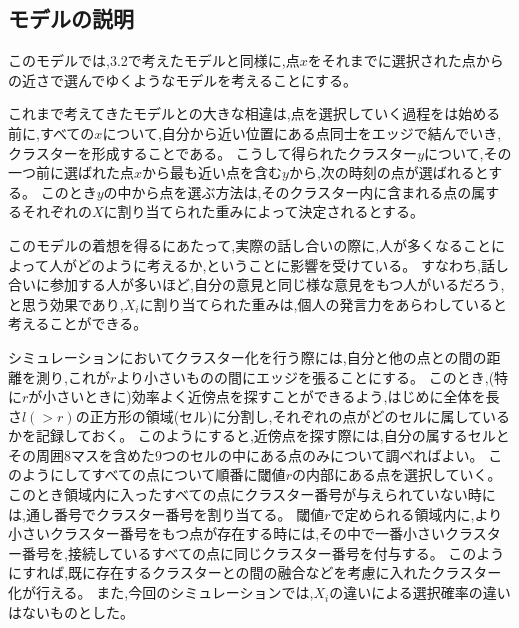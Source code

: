 \subsection{モデルの説明}
このモデルでは,3.2で考えたモデルと同様に,点$x$をそれまでに選択された点からの近さで選んでゆくようなモデルを考えることにする。

これまで考えてきたモデルとの大きな相違は,点を選択していく過程をは始める前に,すべての$x$について,自分から近い位置にある点同士をエッジで結んでいき,クラスターを形成することである。
こうして得られたクラスター$y$について,その一つ前に選ばれた点$x$から最も近い点を含む$y$から,次の時刻の点が選ばれるとする。
このとき$y$の中から点を選ぶ方法は,そのクラスター内に含まれる点の属するそれぞれの$X$に割り当てられた重みによって決定されるとする。

このモデルの着想を得るにあたって,実際の話し合いの際に,人が多くなることによって人がどのように考えるか,ということに影響を受けている。
すなわち,話し合いに参加する人が多いほど,自分の意見と同じ様な意見をもつ人がいるだろう,と思う効果であり,$X_{i}$に割り当てられた重みは,個人の発言力をあらわしていると考えることができる。

シミュレーションにおいてクラスター化を行う際には,自分と他の点との間の距離を測り,これが$r$より小さいものの間にエッジを張ることにする。
このとき,(特に$r$が小さいときに)効率よく近傍点を探すことができるよう,はじめに全体を長さ$l(>r)$の正方形の領域(セル)に分割し,それぞれの点がどのセルに属しているかを記録しておく。
このようにすると,近傍点を探す際には,自分の属するセルとその周囲8マスを含めた9つのセルの中にある点のみについて調べればよい。
このようにしてすべての点について順番に閾値$r$の内部にある点を選択していく。
このとき領域内に入ったすべての点にクラスター番号が与えられていない時には,通し番号でクラスター番号を割り当てる。
閾値$r$で定められる領域内に,より小さいクラスター番号をもつ点が存在する時には,その中で一番小さいクラスター番号を,接続しているすべての点に同じクラスター番号を付与する。
このようにすれば,既に存在するクラスターとの間の融合などを考慮に入れたクラスター化が行える。
また,今回のシミュレーションでは,$X_{i}$の違いによる選択確率の違いはないものとした。

